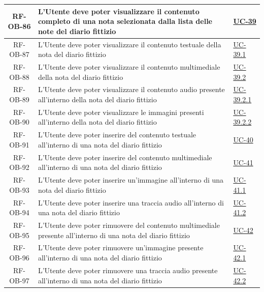\documentclass[a4paper,12pt]{article}
\begin{document}
\begin{center}
\begin{longtable}{|c|p{8.5cm}|>{\centering\arraybackslash}p{4cm}|}
RF-OB-86 & L'Utente deve poter visualizzare il contenuto completo di una nota selezionata dalla lista delle note del diario fittizio & \hyperref[subsec:UC-39]{UC-39} \\
\hline

RF-OB-87 & L'Utente deve poter visualizzare il contenuto testuale della nota del diario fittizio & \hyperref[subsec:UC-39.1]{UC-39.1} \\
\hline

RF-OB-88 & L'Utente deve poter visualizzare il contenuto multimediale della nota del diario fittizio & \hyperref[subsec:UC-39.2]{UC-39.2} \\
\hline

RF-OB-89 & L'Utente deve poter visualizzare il contenuto audio presente all'interno della nota del diario fittizio & \hyperref[subsec:UC-39.2.1]{UC-39.2.1} \\
\hline

RF-OB-90 & L'Utente deve poter visualizzare le immagini presenti all'interno della nota del diario fittizio & \hyperref[subsec:UC-39.2.2]{UC-39.2.2} \\
\hline

RF-OB-91 & L'Utente deve poter inserire del contenuto testuale all'interno di una nota del diario fittizio & \hyperref[subsec:UC-40]{UC-40} \\
\hline

RF-OB-92 & L'Utente deve poter inserire del contenuto multimediale all'interno di una nota del diario fittizio & \hyperref[subsec:UC-41]{UC-41} \\
\hline

RF-OB-93 & L'Utente deve poter inserire un'immagine all'interno di una nota del diario fittizio & \hyperref[subsec:UC-41.1]{UC-41.1} \\
\hline

RF-OB-94 & L'Utente deve poter inserire una traccia audio all'interno di una nota del diario fittizio & \hyperref[subsec:UC-41.2]{UC-41.2} \\
\hline

RF-OB-95 & L'Utente deve poter rimuovere del contenuto multimediale presente all'interno di una nota del diario fittizio & \hyperref[subsec:UC-42]{UC-42} \\
\hline

RF-OB-96 & L'Utente deve poter rimuovere un'immagine presente all'interno di una nota del diario fittizio & \hyperref[subsec:UC-42.1]{UC-42.1} \\
\hline

RF-OB-97 & L'Utente deve poter rimuovere una traccia audio presente all'interno di una nota del diario fittizio & \hyperref[subsec:UC-42.2]{UC-42.2} \\
\hline


\end{longtable}
\end{center}
\end{document}
